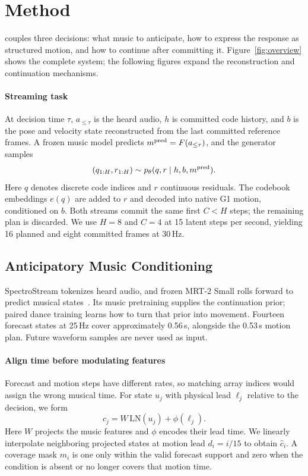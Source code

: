 \section{Method}
\label{sec:method}
\method{} couples three decisions: what music to anticipate, how to express
the response as structured motion, and how to continue after committing it.
Figure~\ref{fig:overview} shows the complete system; the following figures
expand the reconstruction and continuation mechanisms.

\paragraph{Streaming task}
At decision time $\tau$, $a_{\leq\tau}$ is the heard audio, $h$ is committed
code history, and $b$ is the pose and velocity state reconstructed from the
last committed reference frames. A frozen music model predicts
$m^{\rm pred}=F(a_{\leq\tau})$, and the generator samples
\begin{equation}
(q_{1:H},r_{1:H})\sim p_\theta(q,r\mid h,b,m^{\rm pred}).
\label{eq:conditional}
\end{equation}
Here $q$ denotes discrete code indices and $r$ continuous residuals.
The codebook embeddings $e(q)$ are added to $r$ and decoded into
native G1 motion, conditioned on $b$. Both streams commit the same first $C<H$ steps; the
remaining plan is discarded. We use $H=8$ and $C=4$ at 15 latent steps per
second, yielding 16 planned and eight committed frames at 30\,Hz.

\subsection{Anticipatory Music Conditioning}
\label{sec:anticipation}
SpectroStream tokenizes heard audio, and frozen MRT-2 Small rolls forward to
predict musical states~\cite{magenta2026mrt2}. Its music pretraining supplies
the continuation prior; paired dance training learns how to turn that prior
into movement. Fourteen forecast states at 25\,Hz cover approximately
0.56\,s, alongside the 0.53\,s motion plan. Future waveform samples are never
used as input.

\paragraph{Align time before modulating features}
Forecast and motion steps have different rates, so matching array indices
would assign the wrong musical time. For state $u_j$ with physical lead
$\ell_j$ relative to the decision, we form
\begin{equation}
c_j=W\,\mathrm{LN}(u_j)+\phi(\ell_j).
\label{eq:music_projection}
\end{equation}
Here $W$ projects the music features and $\phi$ encodes their lead time.
We linearly interpolate neighboring projected states at motion lead
$d_i=i/15$ to obtain $\hat c_i$. A coverage mask
$m_i$ is one only within the valid forecast support and zero when the
condition is absent or no longer covers that motion time.

